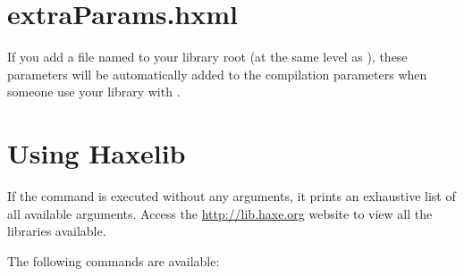 \section{extraParams.hxml}
\label{haxelib-extraParams}

If you add a file named  to your library root (at the same level as ), these parameters will be automatically added to the compilation parameters when someone use your library with .


\section{Using Haxelib}
\label{haxelib-using}

If the  command is executed without any arguments, it prints an exhaustive list of all available arguments. Access the \url{http://lib.haxe.org} website to view all the libraries available. 

The following commands are available:

